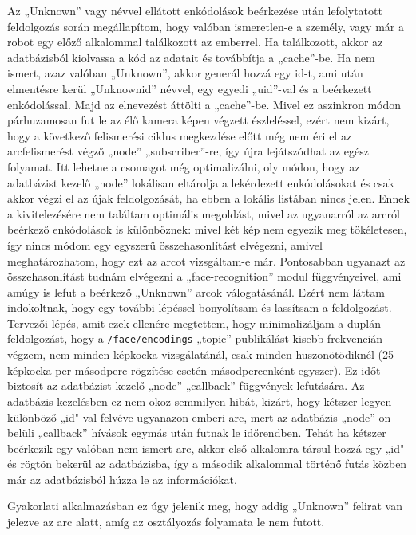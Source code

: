 Az „Unknown” vagy névvel ellátott enkódolások beérkezése után lefolytatott feldolgozás során megállapítom, hogy valóban ismeretlen-e a személy, vagy már a robot egy előző alkalommal találkozott az emberrel. Ha találkozott, akkor az adatbázisból kiolvassa a kód az adatait és továbbítja a „cache”-be. Ha nem ismert, azaz valóban „Unknown”, akkor generál hozzá egy id-t, ami után elmentésre kerül „Unknown\textunderscore id” névvel, egy egyedi „uid”-val és a beérkezett enkódolással. Majd az elnevezést áttölti a „cache”-be. Mivel ez aszinkron módon párhuzamosan fut le az élő kamera képen végzett észleléssel, ezért nem kizárt, hogy a következő felismerési ciklus megkezdése előtt még nem éri el az arcfelismerést végző „node” „subscriber”-re, így újra lejátszódhat az egész folyamat. Itt lehetne a csomagot még optimalizálni, oly módon, hogy az adatbázist kezelő „node” lokálisan eltárolja a lekérdezett enkódolásokat és csak akkor végzi el az újak feldolgozását, ha ebben a lokális listában nincs jelen. Ennek a kivitelezésére nem találtam optimális megoldást, mivel az ugyanarról az arcról beérkező enkódolások is különböznek: mivel két kép nem egyezik meg tökéletesen, így nincs módom egy egyszerű összehasonlítást elvégezni, amivel meghatározhatom, hogy ezt az arcot vizsgáltam-e már. Pontosabban ugyanazt az összehasonlítást tudnám elvégezni a „face-recognition” modul függvényeivel, ami amúgy is lefut a beérkező „Unknown” arcok válogatásánál. Ezért nem láttam indokoltnak, hogy egy további lépéssel bonyolítsam és lassítsam a feldolgozást. Tervezői lépés, amit ezek ellenére megtettem, hogy minimalizáljam a duplán feldolgozást, hogy a \verb|/face/encodings| „topic” publikálást kisebb frekvencián végzem, nem minden képkocka vizsgálatánál, csak minden huszonötödiknél (25 képkocka per másodperc rögzítése esetén másodpercenként egyszer). Ez időt biztosít az adatbázist kezelő „node” „callback” függvények lefutására. Az adatbázis kezelésben ez nem okoz semmilyen hibát, kizárt, hogy kétszer legyen különböző „id"-val felvéve ugyanazon emberi arc, mert az adatbázis „node”-on belüli „callback” hívások egymás után futnak le időrendben. Tehát ha kétszer beérkezik egy valóban nem ismert arc, akkor első alkalomra társul hozzá egy „id" és rögtön bekerül az adatbázisba, így a második alkalommal történő futás közben már az adatbázisból húzza le az információkat.

Gyakorlati alkalmazásban ez úgy jelenik meg, hogy addig „Unknown” felirat van jelezve az arc alatt, amíg az osztályozás folyamata le nem futott. 

